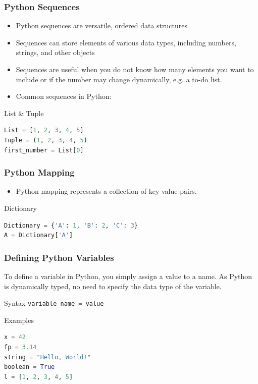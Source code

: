 \documentclass{beamer}
\begin{document}
    \begin{frame}[fragile]
        \frametitle{Python Sequences}
        \begin{itemize}
            \item Python sequences are versatile, ordered data structures
            \item Sequences can store elements of various data types, including numbers, strings, and other objects
            \item Sequences are useful when you do not know how many elements you want to include or if the number may change dynamically, e.g. a to-do list.
            \item Common sequences in Python:
        \end{itemize}
        \begin{exampleblock}{List \& Tuple}
            \begin{lstlisting}[language=Python]
List = [1, 2, 3, 4, 5]
Tuple = (1, 2, 3, 4, 5)
first_number = List[0]
            \end{lstlisting}
        \end{exampleblock}
    \end{frame}

    \begin{frame}[fragile]
        \frametitle{Python Mapping}
        \begin{itemize}
            \item Python mapping represents a collection of key-value pairs.
        \end{itemize}
        \begin{exampleblock}{Dictionary}
            \begin{lstlisting}[language=Python]
Dictionary = {'A': 1, 'B': 2, 'C': 3}
A = Dictionary['A']
            \end{lstlisting}
        \end{exampleblock}
    \end{frame}

    \begin{frame}[fragile]
        \frametitle{Defining Python Variables}
        To define a variable in Python, you simply assign a value to a name. As Python is dynamically typed, no need to specify the data type of the variable.
        \begin{block}{Syntax}
            \lstinline[language=python]{variable_name = value}
        \end{block}
        \begin{exampleblock}{Examples}
            \begin{lstlisting}[language=Python]
x = 42
fp = 3.14
string = "Hello, World!"
boolean = True
l = [1, 2, 3, 4, 5]
            \end{lstlisting}
        \end{exampleblock}
    \end{frame}
\end{document}
